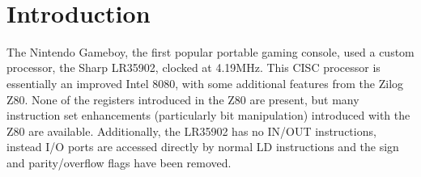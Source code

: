 \vfill{\textit{}}\\[1.0cm]
\section{Introduction}

The Nintendo Gameboy, the first popular portable gaming console, used a custom processor, the Sharp LR35902, clocked at 4.19MHz.  This CISC processor is essentially an improved Intel 8080, with some additional features from the Zilog Z80.  None of the registers introduced in the Z80 are present, but many instruction set enhancements (particularly bit manipulation) introduced with the Z80 are available.  Additionally, the LR35902 has no IN/OUT instructions, instead I/O ports are accessed directly by normal LD instructions and the sign and parity/overflow flags have been removed.
